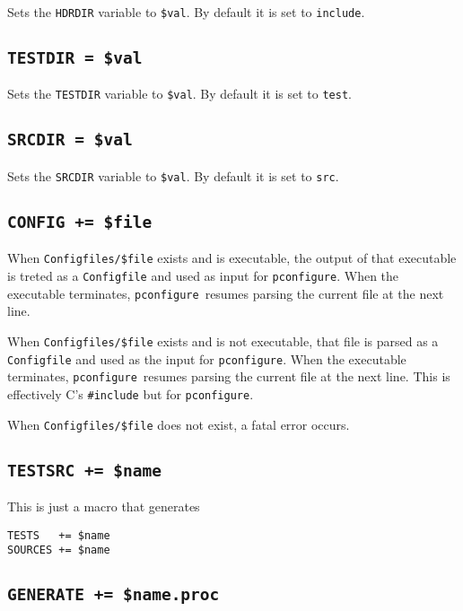 \documentclass{article}
\newcommand{\pconfigure}{\texttt{pconfigure}}
\begin{document}
Sets the \texttt{HDRDIR} variable to \texttt{\$val}.  By default it is
set to \texttt{include}.

\subsection{\texttt{TESTDIR = \$val}}

Sets the \texttt{TESTDIR} variable to \texttt{\$val}.  By default it is
set to \texttt{test}.

\subsection{\texttt{SRCDIR = \$val}}

Sets the \texttt{SRCDIR} variable to \texttt{\$val}.  By default it is
set to \texttt{src}.

\subsection{\texttt{CONFIG += \$file} \label{cmd:config}}

When \texttt{Configfiles/\$file} exists and is executable, the output
of that executable is treted as a \texttt{Configfile} and used as
input for \pconfigure.  When the executable terminates,
\pconfigure\ resumes parsing the current file at the next line.

When \texttt{Configfiles/\$file} exists and is not executable, that
file is parsed as a \texttt{Configfile} and used as the input for
\pconfigure.  When the executable terminates, \pconfigure\ resumes
parsing the current file at the next line.  This is effectively C's
\texttt{\#include} but for \pconfigure.

When \texttt{Configfiles/\$file} does not exist, a fatal error occurs.

\subsection{\texttt{TESTSRC += \$name}}

This is just a macro that generates
\begin{verbatim}
TESTS   += $name
SOURCES += $name
\end{verbatim}

\subsection{\texttt{GENERATE += \$name.proc}}
\end{document}
